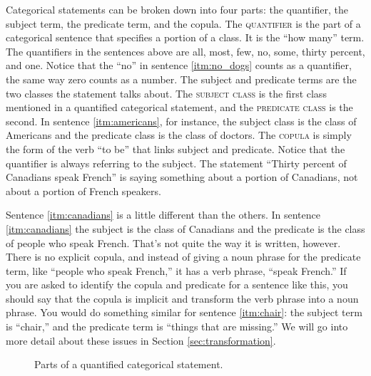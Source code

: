 Categorical statements can be broken down into four parts: the quantifier, the subject term, the predicate term, and the copula. The \textsc{\gls{quantifier}} \label{def:quantifier} is the part of a categorical sentence that specifies a portion of a class. It is the ``how many'' term. The quantifiers in the sentences above are all, most, few, no, some, thirty percent, and one. Notice that the ``no'' in sentence \ref{itm:no_dogs} counts as a quantifier, the same way zero counts as a number. The subject and predicate terms are the two classes the statement talks about. The \textsc{\gls{subject class}} \label{def:subject_class} is the first class mentioned in a quantified categorical statement, and the \textsc{\gls{predicate class}} \label{def:predicate_class} is the second. In sentence \ref{itm:americans}, for instance, the subject class is the class of Americans and the predicate class is the class of doctors.  The \textsc{\gls{copula}} \label{def:copula} is simply the form of the verb ``to be'' that links subject and predicate. Notice that the quantifier is always referring to the subject. The statement ``Thirty percent of Canadians speak French'' is saying something about a portion of Canadians, not about a portion of French speakers.

Sentence \ref{itm:canadians} is a little different than the others. In sentence \ref{itm:canadians} the subject is the class of Canadians and the predicate is the class of people who speak French. That's not quite the way it is written, however. There is no explicit copula, and instead of giving a noun phrase for the predicate term, like ``people who speak French,'' it has a verb phrase, ``speak French.'' If you are asked to identify the copula and predicate for a sentence like this, you should say that the copula is implicit and transform the verb phrase into a noun phrase. You would do something similar for sentence \ref{itm:chair}: the subject term is ``chair,'' and the predicate term is ``things that are missing.'' We will go into more detail about these issues in Section \ref{sec:transformation}.


\begin{figure}
\caption{Parts of a quantified categorical statement.}
\label{fig:Partsofacategoricalstatement}
\end{figure}

